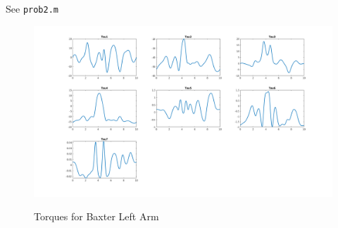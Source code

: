 \documentclass{../homework}
\begin{document}
\begin{parts}[n]
       \part{} See \texttt{prob2.m}
        \begin{figure}[H]
            \centering
            \includegraphics[scale=.3]{prob2.png}
            \label{torq}
            \caption{Torques for Baxter Left Arm}
       \end{figure}

   \end{parts}
\end{document}
